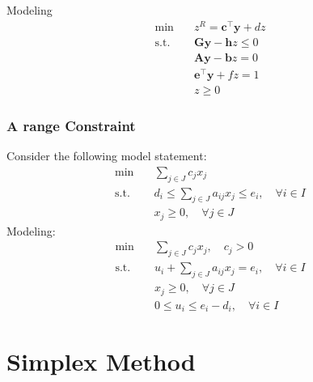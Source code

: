				Modeling
				\begin{align}
					\min \quad & z^R = \mathbf{c^\top y} + dz\\
					\text{s.t.} \quad & \mathbf{Gy} - \mathbf{h}z \le 0\\
									  & \mathbf{Ay} - \mathbf{b}z = 0\\
									  & \mathbf{e^\top y} + fz = 1\\
									  & z \ge 0
				\end{align}

			\subsection{A range Constraint}
				Consider the following model statement:
				\begin{align}
					\min \quad & \sum_{j\in J}c_jx_j \\
					\text{s.t.} \quad & d_i\le \sum_{j\in J}a_{ij}x_j \le e_i, \quad \forall i\in I \\
					                  & x_j \ge 0, \quad \forall j\in J 
				\end{align}
				Modeling:
				\begin{align}
					\min \quad & \sum_{j\in J}c_jx_j, \quad c_j > 0 \\
					\text{s.t.} \quad & u_i + \sum_{j\in J}a_{ij}x_j = e_i, \quad \forall i\in I \\
					                  & x_j \ge 0, \quad \forall j\in J \\
					                  & 0\le u_i \le e_i-d_i, \quad \forall i\in I 
				\end{align}

	\chapter{Simplex Method}
